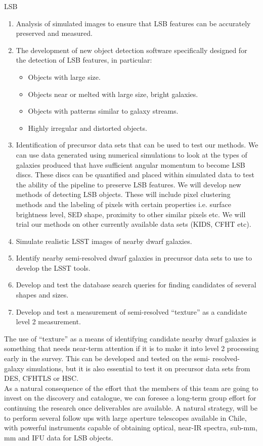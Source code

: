 \begin{tasklist}{LSB}
\begin{task}
{\begin{enumerate}
\item Analysis of simulated images to ensure that LSB features can be accurately preserved and measured.
\item The development of new object detection software specifically designed for the detection of LSB features, in particular:
\begin{itemize}
\item Objects with large size.
\item Objects near or melted with large size, bright galaxies.
\item Objects with patterns similar to galaxy streams.
\item Highly irregular and distorted objects.
\end{itemize}
\item Identification of precursor data sets that can be used to test our methods.  We can use data generated using numerical simulations to look at the types of galaxies produced that have sufficient angular momentum to become LSB discs. These discs can be quantified and placed within simulated data to test the ability of the pipeline to preserve LSB features. We will develop new methods of detecting LSB objects. These will include pixel clustering methods and the labeling of pixels with certain properties i.e. surface brightness level, SED shape, proximity to other similar pixels etc. We will trial our methods on other currently available data sets (KIDS, CFHT etc).
\item Simulate realistic LSST images of nearby dwarf galaxies.
\item Identify nearby semi-resolved dwarf galaxies in precursor data sets to use to develop the LSST tools.
\item Develop and test the database search queries for finding candidates of several shapes and sizes.
\item Develop and test a measurement of semi-resolved ``texture'' as a candidate level 2 measurement.
\end{enumerate}
The use of ``texture'' as a means of identifying candidate nearby dwarf galaxies is something that needs near-term attention if it is to make it into level 2 processing early in the survey. This can be developed and tested on the semi- resolved-galaxy simulations, but it is also essential to test it on precursor data sets from DES, CFHTLS or HSC.
\\
As a natural consequence of the effort that the members of this team are going to invest on the discovery and catalogue, we can foresee a long-term group effort for continuing the research once deliverables are available. A natural strategy, will be to perform several follow ups with large aperture telescopes available in Chile, with powerful instruments capable of obtaining optical, near-IR spectra, sub-mm, mm and IFU data for LSB objects.
}
\end{task}
\end{tasklist}
